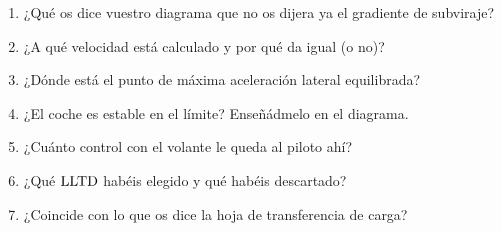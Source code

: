\begin{juez}
\begin{enumerate}
  \item ¿Qué os dice vuestro diagrama que no os dijera ya el gradiente de
        subviraje?
  \item ¿A qué velocidad está calculado y por qué da igual (o no)?
  \item ¿Dónde está el punto de máxima aceleración lateral equilibrada?
  \item ¿El coche es estable en el límite? Enseñádmelo en el diagrama.
  \item ¿Cuánto control con el volante le queda al piloto ahí?
  \item ¿Qué $\mathrm{LLTD}$ habéis elegido y qué habéis descartado?
  \item ¿Coincide con lo que os dice la hoja de transferencia de carga?
\end{enumerate}
\end{juez}
